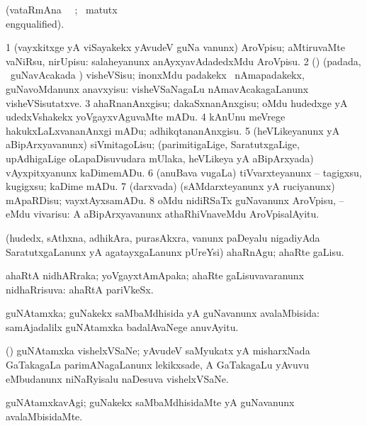\bentry
{}
\gl{\kirx}
(vataRmAna \parxpu\ \Eva\ ; \BU\ matutx \BUkaq\\eng{qualified}).

\noindent
\gl{\sakirx}
\bmng
\bnum
\num{1} (vayxkitxge yA viSayakekx yAvudeV guNa \mo vanunx) AroVpisu; aMtiruvaMte vaNiRsu, nirUpisu:  salaheyanunx anAyxyavAdadedxMdu AroVpisu. 
\num{2} (\vAyx) (padada, \kanmu\ guNavAcakada \vi) visheVSisu; inonxMdu padakekx \kanmu\ nAmapadakekx, guNavoMdanunx anavxyisu:  visheVSaNagaLu nAmavAcakagaLanunx visheVSisutatxve. 
\num{3} ahaRnanAnxgisu; dakaSxnanAnxgisu; oMdu hudedxge yA udedxVshakekx yoVgayxvAguvaMte mADu. 
\num{4} kAnUnu meVrege hakukxLaLxvananAnxgi mADu; adhikqtananAnxgisu. 
\num{5} (heVLikeyanunx yA aBipArxyavanunx) siVmitagoLisu; (parimitigaLige, SaratutxgaLige, upAdhigaLige oLapaDisuvudara mUlaka, heVLikeya yA aBipArxyada) vAyxpitxyanunx kaDimemADu. 
\num{6} (anuBava \mo vugaLa) tiVvarxteyanunx -- tagigxsu, kugigxsu; kaDime mADu. 
\num{7} (darxvada) (sAMdarxteyanunx yA ruciyanunx) mApaRDisu; vayxtAyxsamADu. 
\num{8} oMdu nidiRSaTx guNavanunx AroVpisu, -- eMdu vivarisu:  A aBipArxyavanunx athaRhiVnaveMdu AroVpisalAyitu. 
\enum
\emng

\noindent
\gl{\akirx}
\bmng
(hudedx, sAthxna, adhikAra, purasAkxra, \mo vanunx paDeyalu nigadiyAda SaratutxgaLanunx yA agatayxgaLanunx pUreYsi) ahaRnAgu; ahaRte gaLisu. 
\emng
\eentry

\bentry
{}
\gl{\gu}
\bmng
ahaRtA nidhARraka; yoVgayxtAmApaka; ahaRte gaLisuvavaranunx nidhaRrisuva:  ahaRtA pariVkeSx. 
\emng
\eentry

\bentry
{}
\gl{\gu}
\bmng
guNAtamxka; guNakekx saMbaMdhisida yA guNavanunx avalaMbisida:    samAjadalilx guNAtamxka badalAvaNege anuvAyitu. 
\emng
\eentry

\bentry
{}
\gl{\nA}
\bmng
(\ravi) guNAtamxka vishelxVSaNe; yAvudeV saMyukatx yA misharxNada GaTakagaLa parimANagaLanunx lekikxsade, A GaTakagaLu yAvuvu eMbudanunx niNaR\-yisalu naDesuva vishelxVSaNe. 
\emng
\eentry

\bentry
{}
\gl{\kirxvi}
\bmng
guNAtamxkavAgi; guNakekx saMbaMdhisidaMte yA guNavanunx avalaMbisidaMte. 
\emng
\eentry

